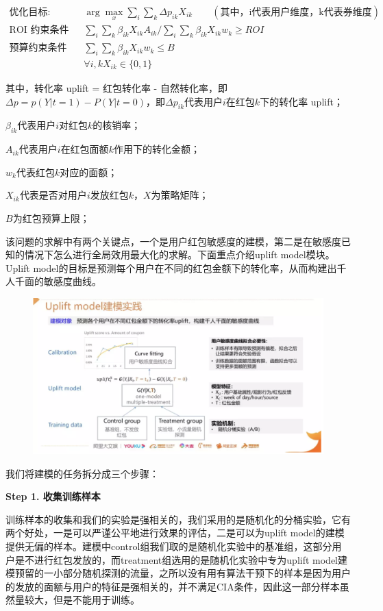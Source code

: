 \documentclass[12pt]{article}
\begin{document}
\begin{align*}
\text{优化目标}: \qquad & \arg\max_x \sum_i\sum_k \Delta p_{ik}X_{ik}  \qquad(\text{其中，i代表用户维度，k代表券维度}) \\
\text{ROI 约束条件} \qquad & \sum_i\sum_k\beta_{ik}X_{ik}A_{ik} / \sum_i\sum_k\beta_{ik}X_{ik}w_k \ge ROI \\
\text{预算约束条件} \qquad & \sum_i\sum_k\beta_{ik}X_{ik}w_{k} \le B \\
& \forall i, k X_{ik} \in \{0, 1\}
\end{align*}

其中，转化率 uplift = 红包转化率 - 自然转化率，即$\Delta p = p(Y|t = 1) - P(Y|t = 0) $，即$\Delta p_{ik}$代表用户$i$在红包$k$下的转化率 uplift；

$\beta_{ik}$代表用户$i$对红包$k$的核销率；

$A_{ik}$代表用户$i$在红包面额$k$作用下的转化金额；

$w_{k}$代表红包$k$对应的面额；

$X_{ik}$代表是否对用户$i$发放红包$k$，$X$为策略矩阵；

$B$为红包预算上限；




该问题的求解中有两个关键点，一个是用户红包敏感度的建模，第二是在敏感度已知的情况下怎么进行全局效用最大化的求解。下面重点介绍uplift model模块。Uplift model的目标是预测每个用户在不同的红包金额下的转化率，从而构建出千人千面的敏感度曲线。
\begin{figure}[H]
    \centering
    \includegraphics[width=1\textwidth]{fig/CasualInference-Uplift-Model-In-Ali3.png}
\end{figure}

我们将建模的任务拆分成三个步骤：

\textbf{ Step 1. 收集训练样本}

训练样本的收集和我们的实验是强相关的，我们采用的是随机化的分桶实验，它有两个好处，一是可以严谨公平地进行效果的评估，二是可以为uplift model的建模提供无偏的样本。建模中control组我们取的是随机化实验中的基准组，这部分用户是不进行红包发放的，而treatment组选用的是随机化实验中专为uplift model建模预留的一小部分随机探测的流量，之所以没有用有算法干预下的样本是因为用户的发放的面额与用户的特征是强相关的，并不满足CIA条件，因此这一部分样本虽然量较大，但是不能用于训练。
\end{document}

